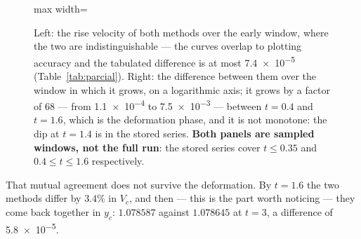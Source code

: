\begin{figure}[htbp]
\centering
\begin{adjustbox}{max width=\linewidth}
\end{adjustbox}
\caption{Left: the rise velocity of both methods over the early window, where
the two are indistinguishable --- the curves overlap to plotting accuracy and
the tabulated difference is at most \num{7.4e-5} (Table~\ref{tab:parcial}).
Right: the difference between them over the window in which it grows, on a
logarithmic axis; it grows by a factor of $68$ --- from \num{1.1e-4} to
\num{7.5e-3} --- between $t=0.4$ and $t=1.6$, which is the deformation
phase, and it is not monotone: the dip at $t=1.4$ is in the stored series. \textbf{Both panels are sampled
windows, not the full run}: the stored series cover $t \le 0.35$ and
$0.4 \le t \le 1.6$ respectively.
}
\label{fig:hysing-series}
\end{figure}

That mutual agreement does not survive the deformation. By $t=1.6$ the two
methods differ by $3.4\%$ in $V_c$, and then --- this is the part worth
noticing --- they come back together in $y_c$: $1.078587$ against $1.078645$ at
$t=3$, a difference of \num{5.8e-5}.

